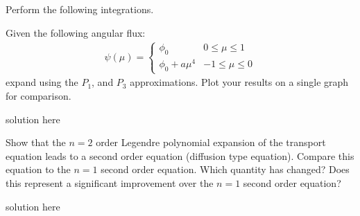 \documentclass[11pt,answers]{exam}
\begin{document}
\begin{questions}

        \question[20] Perform the following integrations.

        \question[40] Given the following angular flux:
        \begin{align}
                        \psi(\mu) = 
                \begin{cases}
                        \phi_0 & 0\le \mu \le 1\\
                        \phi_0  + a \mu^4 & -1\le \mu \le 0
                \end{cases}
        \end{align}
        expand using the $P_1$, and $P_3$ approximations. Plot your results on a single graph for
comparison.
        \begin{solution}
                solution here
        \end{solution}

        \question[20] Show that the $n=2$ order Legendre polynomial expansion of 
        the transport equation leads to a second order equation (diffusion type 
        equation). Compare this equation to the $n=1$ second order equation. 
        Which quantity has changed? Does this represent a significant 
        improvement over the $n=1$ second order equation?

        \begin{solution}
                solution here
        \end{solution}



\end{questions}
\end{document}
